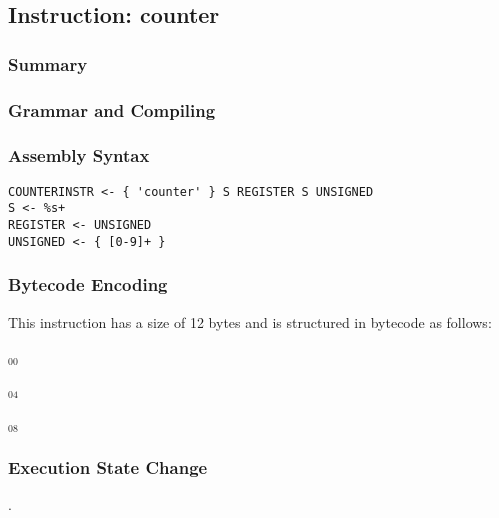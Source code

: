\subsection{Instruction: counter}

\subsubsection{Summary}


\subsubsection{Grammar and Compiling}


\subsubsection{Assembly Syntax}

\begin{myquote}
\begin{verbatim}
COUNTERINSTR <- { 'counter' } S REGISTER S UNSIGNED
S <- %s+
REGISTER <- UNSIGNED
UNSIGNED <- { [0-9]+ }
\end{verbatim}
\end{myquote}

\subsubsection{Bytecode Encoding}

This instruction has a size of 12 bytes and is structured in bytecode as follows:

$_{00}$\ 



$_{04}$\ 



$_{08}$\ 
\fbox{%
  \parbox{20pt}{%
00
  }%
}


\subsubsection{Execution State Change}

.


